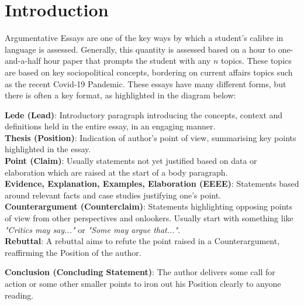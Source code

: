 \documentclass[12pt]{article}
\begin{document}
{\thispagestyle{empty}

\newpage

\tableofcontents

\thispagestyle{empty}
\newpage

\section{Introduction}

Argumentative Essays are one of the key ways by which a student's calibre in language is assessed. Generally, this quantity is assessed based on a hour to one-and-a-half hour paper that prompts the student with any $n$ topics. These topics are based on key sociopolitical concepts, bordering on current affairs topics such as the recent Covid-19 Pandemic. These essays have many different forms, but there is often a key format, as highlighted in the diagram below:

\begin{framed}\noindent
        \textbf{Lede (Lead)}: Introductory paragraph introducing the concepts, context and definitions held in the entire essay, in an engaging manner. \\
        
        \textbf{Thesis (Position)}: Indication of author's point of view, summarising key points highlighted in the essay. \\
        
        \textbf{Point (Claim)}: Usually statements not yet justified based on data or elaboration which are raised at the start of a body paragraph. \\
        
        \textbf{Evidence, Explanation, Examples, Elaboration (EEEE)}: Statements based around relevant facts and case studies justifying one's point. \\
        
        \textbf{Counterargument (Counterclaim)}: Statements highlighting opposing points of view from other perspectives and onlookers. Usually start with something like \textit{"Critics may say..."} or \textit{"Some may argue that..."}. \\
        
        \textbf{Rebuttal}: A rebuttal aims to refute the point raised in a Counterargument, reaffirming the Position of the author.
        
        \textbf{Conclusion (Concluding Statement)}: The author delivers some call for action or some other smaller points to iron out his Position clearly to anyone reading.
\end{framed}

}
\end{document}

